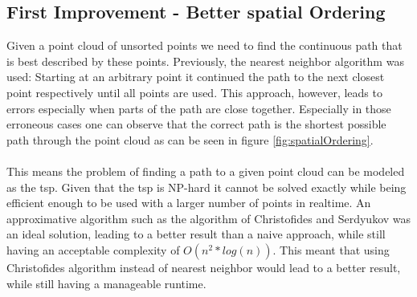 \subsection{First Improvement - Better spatial Ordering}
Given a point cloud of unsorted points we need to find the continuous path that is best described by these points. Previously, the nearest neighbor algorithm was used: Starting at an arbitrary point it continued the path to the next closest point respectively until all points are used. This approach, however, leads to errors especially when parts of the path are close together. Especially in those erroneous cases one can observe that the correct path is the shortest possible path through the point cloud as can be seen in figure \ref{fig:spatialOrdering}.\\
\\
This means the problem of finding a path to a given point cloud can be modeled as the \ac{tsp}. Given that the \ac{tsp} is NP-hard\cite{Korte2008} it cannot be solved exactly while being efficient enough to be used with a larger number of points in realtime. An approximative algorithm such as the algorithm of Christofides and Serdyukov was an ideal solution, leading to a better result than a naive approach, while still having an acceptable complexity of $O(n^2 * log(n))$\cite{Christofides2022}. This meant that using Christofides algorithm instead of nearest neighbor would lead to a better result, while still having a manageable runtime. 

